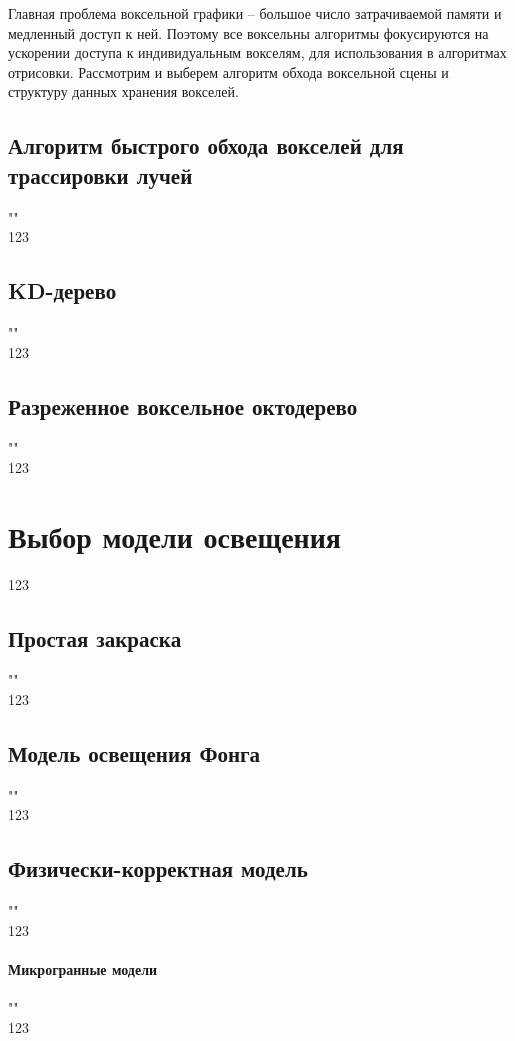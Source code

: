 Главная проблема воксельной графики -- большое число затрачиваемой памяти и медленный доступ к ней.
Поэтому все воксельны алгоритмы фокусируются на ускорении доступа к индивидуальным вокселям, для
использования в алгоритмах отрисовки. Рассмотрим и выберем алгоритм обхода воксельной сцены и 
структуру данных хранения вокселей.

\subsection{Алгоритм быстрого обхода вокселей для трассировки лучей}""\\
123~\cite{AFVTAfRT}

\subsection{KD-дерево}""\\
123~\cite{KDTASfaGR}

\subsection{Разреженное воксельное октодерево}""\\
123~\cite{ESVOAEaI}

\section{Выбор модели освещения}

123

\subsection{Простая закраска}""\\
123~\cite{Rodzhers}

\subsection{Модель освещения Фонга}""\\
123~\cite{IFCGP}

\subsection{Физически-корректная модель}""\\
123~\cite{PBRT3e}

\paragraph{Микрогранные модели}""\\
123~\cite{PBRT3e}~\cite{MMfRrRS}

